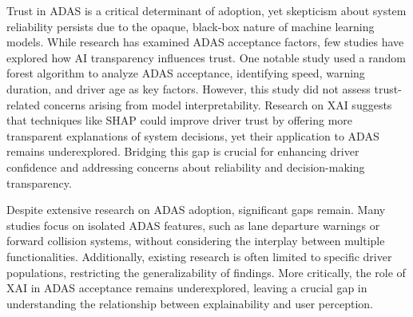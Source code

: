 Trust in ADAS is a critical determinant of adoption, yet skepticism about system reliability persists due to the opaque, black-box nature of machine learning models. While research has examined ADAS acceptance factors, few studies have explored how AI transparency influences trust. One notable study \cite{xu2021modeling} used a random forest algorithm to analyze ADAS acceptance, identifying speed, warning duration, and driver age as key factors. However, this study did not assess trust-related concerns arising from model interpretability. Research on XAI suggests that techniques like SHAP could improve driver trust by offering more transparent explanations of system decisions, yet their application to ADAS remains underexplored. Bridging this gap is crucial for enhancing driver confidence and addressing concerns about reliability and decision-making transparency.

Despite extensive research on ADAS adoption, significant gaps remain. Many studies focus on isolated ADAS features, such as lane departure warnings or forward collision systems, without considering the interplay between multiple functionalities. Additionally, existing research is often limited to specific driver populations, restricting the generalizability of findings. More critically, the role of XAI in ADAS acceptance remains underexplored, leaving a crucial gap in understanding the relationship between explainability and user perception.